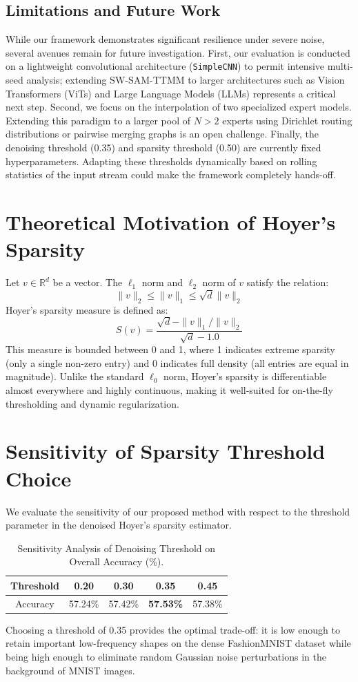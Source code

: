\documentclass{article}
\theoremstyle{plain}
\theoremstyle{definition}
\theoremstyle{remark}
\begin{document}
\subsection{Limitations and Future Work}
While our framework demonstrates significant resilience under severe noise, several avenues remain for future investigation. First, our evaluation is conducted on a lightweight convolutional architecture (\texttt{SimpleCNN}) to permit intensive multi-seed analysis; extending SW-SAM-TTMM to larger architectures such as Vision Transformers (ViTs) and Large Language Models (LLMs) represents a critical next step. Second, we focus on the interpolation of two specialized expert models. Extending this paradigm to a larger pool of $N > 2$ experts using Dirichlet routing distributions or pairwise merging graphs is an open challenge. Finally, the denoising threshold (0.35) and sparsity threshold (0.50) are currently fixed hyperparameters. Adapting these thresholds dynamically based on rolling statistics of the input stream could make the framework completely hands-off.

\clearpage



\clearpage
\appendix
\section{Theoretical Motivation of Hoyer's Sparsity}
\label{app:hoyer}
Let $v \in \mathbb{R}^d$ be a vector. The $\ell_1$ norm and $\ell_2$ norm of $v$ satisfy the relation:
\begin{equation}
  \|v\|_2 \le \|v\|_1 \le \sqrt{d} \|v\|_2
\end{equation}
Hoyer's sparsity measure is defined as:
\begin{equation}
  S(v) = \frac{\sqrt{d} - \|v\|_1 / \|v\|_2}{\sqrt{d} - 1.0}
\end{equation}
This measure is bounded between 0 and 1, where 1 indicates extreme sparsity (only a single non-zero entry) and 0 indicates full density (all entries are equal in magnitude). Unlike the standard $\ell_0$ norm, Hoyer's sparsity is differentiable almost everywhere and highly continuous, making it well-suited for on-the-fly thresholding and dynamic regularization.

\section{Sensitivity of Sparsity Threshold Choice}
\label{app:threshold}
We evaluate the sensitivity of our proposed method with respect to the threshold parameter in the denoised Hoyer's sparsity estimator.
\begin{table}[h]
  \centering
  \caption{Sensitivity Analysis of Denoising Threshold on Overall Accuracy (\%).}
  \begin{tabular}{ccccc}
    \toprule
    Threshold & 0.20 & 0.30 & 0.35 & 0.45 \\
    \midrule
    Accuracy  & 57.24\% & 57.42\% & \textbf{57.53\%} & 57.38\% \\
    \bottomrule
  \end{tabular}
\end{table}

Choosing a threshold of 0.35 provides the optimal trade-off: it is low enough to retain important low-frequency shapes on the dense FashionMNIST dataset while being high enough to eliminate random Gaussian noise perturbations in the background of MNIST images.
\end{document}
